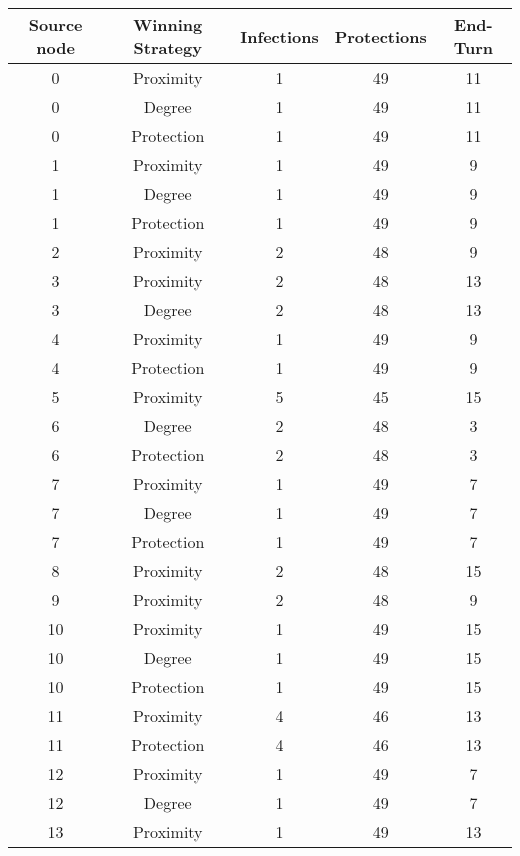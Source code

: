 \documentclass[results.tex]{subfiles}
\begin{document}
\begin{center}
  \begin{tabular}{| c || c | c | c | c |}
    \hline
    {\bfseries Source node} & {\bfseries Winning Strategy} & {\bfseries Infections} & {\bfseries Protections} & {\bfseries End-Turn} \\  %
    \hline\hline
    0 & Proximity & 1 & 49 & 11 \\ 
    \hline
    0 & Degree & 1 & 49 & 11 \\ 
    \hline
    0 & Protection & 1 & 49 & 11 \\ 
    \hline
    1 & Proximity & 1 & 49 & 9 \\ 
    \hline
    1 & Degree & 1 & 49 & 9 \\ 
    \hline
    1 & Protection & 1 & 49 & 9 \\ 
    \hline
    2 & Proximity & 2 & 48 & 9 \\ 
    \hline
    3 & Proximity & 2 & 48 & 13 \\ 
    \hline
    3 & Degree & 2 & 48 & 13 \\ 
    \hline
    4 & Proximity & 1 & 49 & 9 \\ 
    \hline
    4 & Protection & 1 & 49 & 9 \\ 
    \hline
    5 & Proximity & 5 & 45 & 15 \\ 
    \hline
    6 & Degree & 2 & 48 & 3 \\ 
    \hline
    6 & Protection & 2 & 48 & 3 \\ 
    \hline
    7 & Proximity & 1 & 49 & 7 \\ 
    \hline
    7 & Degree & 1 & 49 & 7 \\ 
    \hline
    7 & Protection & 1 & 49 & 7 \\ 
    \hline
    8 & Proximity & 2 & 48 & 15 \\ 
    \hline
    9 & Proximity & 2 & 48 & 9 \\ 
    \hline
    10 & Proximity & 1 & 49 & 15 \\ 
    \hline
    10 & Degree & 1 & 49 & 15 \\ 
    \hline
    10 & Protection & 1 & 49 & 15 \\ 
    \hline
    11 & Proximity & 4 & 46 & 13 \\ 
    \hline
    11 & Protection & 4 & 46 & 13 \\ 
    \hline
    12 & Proximity & 1 & 49 & 7 \\ 
    \hline
    12 & Degree & 1 & 49 & 7 \\ 
    \hline
    13 & Proximity & 1 & 49 & 13 \\ 

\end{tabular}
\end{center}
\end{document}
